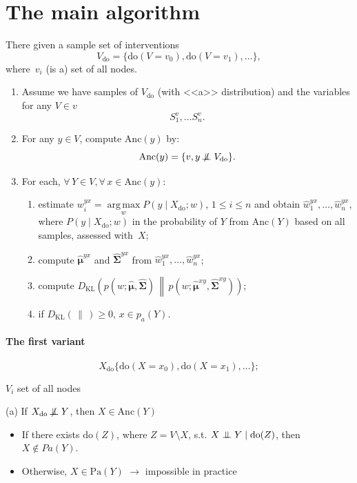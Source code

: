 \documentclass[12pt]{article}
\newcommand\indep{\mathrel{\perp\mspace{-10mu}\perp}}
\newcommand\nindep{\mathrel{\mathrlap{\not}\mspace{-7mu}\indep}}
\newcommand{\KL}[2]{D_{\mathrm{KL}}\!\left(#1 \,\middle\|\, #2\right)}
\newcommand{\doop}{\mathrm{do}}
\newcommand{\Anc}{\mathrm{Anc}}
\newcommand{\Pa}{\mathrm{Pa}}
\newcommand{\argmax}{\operatorname*{arg\,max}\limits}
\newcommand{\bmu}{\boldsymbol{\mu}}
\newcommand{\bSig}{\boldsymbol{\Sigma}}
\begin{document}
\maketitle
\section{The main algorithm}

There given a sample set of interventions
\[
    V_\doop = \{\doop(V = v_0), \doop(V = v_1), \dots \},
\]
where~$v_i$ (is a) set of all nodes.

\begin{enumerate}%
    \item Assume we have samples of $V_\doop$ (with <<a>> distribution) and the variables for any $V\in v$
    \[
        S_1^v,\dots S_n^v.
    \]
    \item For any $y \in V$, compute $\Anc(y)$ by:
    \[
        \Anc(y) = \{ v, y \nindep V_\doop \}.
    \]
    \item For each, $\forall\, Y \in V, \forall\, x \in \Anc(y)$:
    \begin{enumerate}%
        \item estimate $w_i^{yx} = \argmax_w P(y\mid X_\doop; w)$,
        $ 1 \leq i \leq n$ and obtain $\hat{w}_1^{yx}, \dots, \hat{w}_n^{yx}$,
        where $P(y\mid X_\doop; w)$ in the probability of $Y$ from $\Anc(Y)$ based on all samples, assessed with~$X$;
        \item compute $\hat{\bmu}^{yx}$ and  $\hat{\bSig}^{yx}$ from $\hat{w}_1^{yx}, \dots, \hat{w}_n^{yx}$;
        \item compute $\KL{p(w; \hat{\bmu}, \hat{\bSig})}{p(w; \hat{\bmu}^{xy}, \hat{\bSig}^{xy})}$;
        \item if $\KL{}{} \geq 0$, $x \in p_a(Y)$.
    \end{enumerate}
\end{enumerate}

\paragraph{The first variant}
\[
X_\doop \{ \doop (X = x_0), \doop (X=x_1), \dots \};
\]

$V_i$ set of all nodes

(a) If $X_\doop \nindep Y$, then $X \in \Anc(Y)$

\begin{itemize}
    \item If there exists $\doop(Z)$, where $Z = V\setminus X$, s.t. $X\indep Y \mid \doop(Z)$, then $X\notin Pa(Y)$.
    \item Otherwise, $X\in\Pa(Y)$ $\to$ impossible in practice
\end{itemize}
\end{document}
